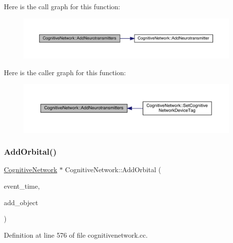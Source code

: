 Here is the call graph for this function\+:
\nopagebreak
\begin{figure}[H]
\begin{center}
\leavevmode
\includegraphics[width=350pt]{class_cognitive_network_a085f61ab94b71406a0a5e11d789ed69c_cgraph}
\end{center}
\end{figure}
Here is the caller graph for this function\+:
\nopagebreak
\begin{figure}[H]
\begin{center}
\leavevmode
\includegraphics[width=350pt]{class_cognitive_network_a085f61ab94b71406a0a5e11d789ed69c_icgraph}
\end{center}
\end{figure}
\mbox{\label{class_cognitive_network_ab6caa285c25568259ae935cf9e746af4}} 
\subsubsection{\texorpdfstring{Add\+Orbital()}{AddOrbital()}}
{\footnotesize\ttfamily \hyperlink{class_cognitive_network}{Cognitive\+Network} $\ast$ Cognitive\+Network\+::\+Add\+Orbital (\begin{DoxyParamCaption}\item[{std\+::chrono\+::time\+\_\+point$<$ \hyperlink{universe_8h_a0ef8d951d1ca5ab3cfaf7ab4c7a6fd80}{Clock} $>$}]{event\+\_\+time,  }\item[{\hyperlink{class_cognitive_network}{Cognitive\+Network} $\ast$}]{add\+\_\+object }\end{DoxyParamCaption})}



Definition at line 576 of file cognitivenetwork.\+cc.

